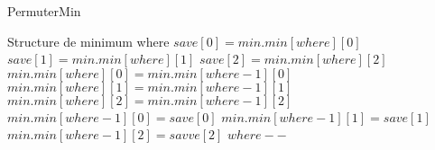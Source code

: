 \documentclass[11pt]{ctexart}
\begin{document}
\renewcommand{\thealgorithm}{} %
    \begin{algorithm}
        \caption{PermuterMin} %
        \begin{algorithmic}[1] %
            \Require Structure de minimum
            \Require where
                \State $save[0] = min.min[where][0]$
                \State $save[1] = min.min[where][1]$
                \State $save[2] = min.min[where][2]$
                \State $min.min[where][0] = min.min[where-1][0]$
                \State $min.min[where][1] = min.min[where-1][1]$
                \State $min.min[where][2] = min.min[where-1][2]$
                \State $min.min[where-1][0] = save[0]$
                \State $min.min[where-1][1] = save[1]$
                \State $min.min[where-1][2] = savve[2]$
                \State $where--$
            \EndWhile
        \end{algorithmic}
    \end{algorithm}
\end{document}
